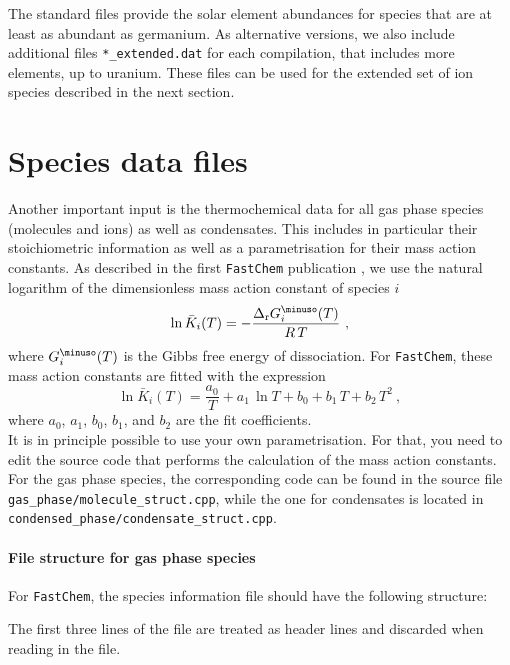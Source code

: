 \documentclass[numbers=noenddot]{aux/fcmanual}
\newcommand{\fc}{\texttt{FastChem}\xspace}
\begin{document}
The standard files provide the solar element abundances for species that are at least as abundant as germanium. As alternative versions, we also include additional files \verb|*_extended.dat| for each compilation, that includes more elements, up to uranium. These files can be used for the extended set of ion species described in the next section.


\section{Species data files}

Another important input is the thermochemical data for all gas phase species (molecules and ions) as well as condensates. This includes in particular their stoichiometric information as well as a parametrisation for their mass action constants. As described in the first \fc publication \citep{Stock2018MNRAS.479..865S}, we use the natural logarithm of the dimensionless mass action constant of species $i$
\begin{equation}
\ln\bar{K}_i(T) = - \frac{\Delta_\mathrm{r} G_i^\minuso(T)}{R\,T} \ ,
\label{eq:lnK}
\end{equation}
where $G_i^\minuso(T)$ is the Gibbs free energy of dissociation. 
For \fc, these mass action constants are fitted with the expression
\begin{equation}
\ln\bar{K}_i(T) = \frac{a_0}{T} + a_1\,\ln T + b_0 + b_1\,T + b_2\,T^2 \ ,
\label{eq:fit}
\end{equation}
where $a_0$, $a_1$, $b_0$, $b_1$, and $b_2$ are the fit coefficients.\\
It is in principle possible to use your own parametrisation. For that, you need to edit the source code that performs the calculation of the mass action constants. For the gas phase species, the corresponding code can be found in the source file \verb|gas_phase/molecule_struct.cpp|, while the one for condensates is located in \verb|condensed_phase/condensate_struct.cpp|.

\paragraph{File structure for gas phase species}
For \fc, the species information file should have the following structure:

The first three lines of the file are treated as header lines and discarded when reading in the file. \\
\end{document}
